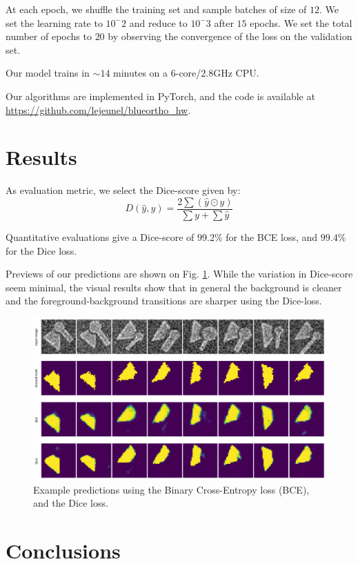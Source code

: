 \documentclass[11pt]{article}
\begin{document}
At each epoch, we shuffle the training set and sample batches of size of \(12\).
We set the learning rate to \(10^-2\) and reduce to \(10^-3\) after \(15\) epochs.
We set the total number of epochs to \(20\) by observing the convergence of the loss
on the validation set.

Our model trains in \(\sim 14\) minutes on a 6-core/2.8GHz CPU.

Our algorithms are implemented in PyTorch, and the code is available at \url{https://github.com/lejeunel/blueortho\_hw}.

\section{Results}
\label{sec:org2e19306}

As evaluation metric, we select the Dice-score given by:
\[
D(\hat{y}, y) = \frac{2 \sum(\hat{y} \odot y)}{\sum y + \sum \hat{y}}
\]

Quantitative evaluations give a Dice-score of \(99.2\%\) for the BCE loss, and \(99.4\%\) for the
Dice loss.

Previews of our predictions are shown on Fig. \ref{fig:test_prev}.
While the variation in Dice-score seem minimal, the visual results show that in general
the background is cleaner and the foreground-background transitions are sharper
using the Dice-loss.

\begin{figure}[htbp]
\centering
\includegraphics[width=.9\linewidth]{./test.png}
\caption{\label{fig:test_prev}Example predictions using the Binary Cross-Entropy loss (BCE), and the Dice loss.}
\end{figure}

\section{Conclusions}
\label{sec:orgfd0379a}
\end{document}
